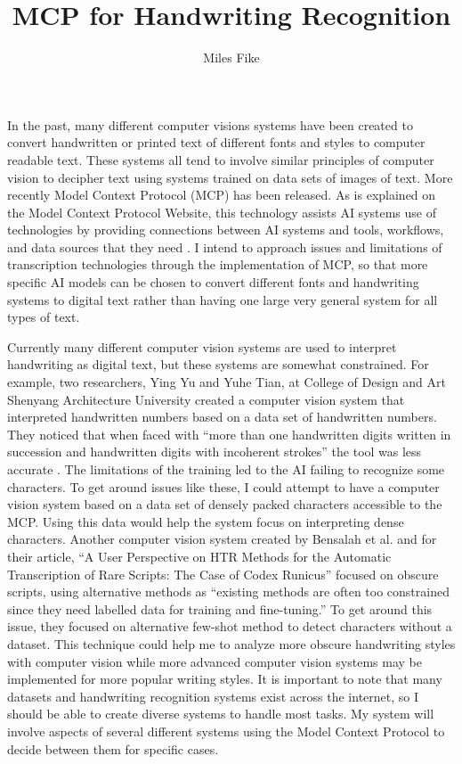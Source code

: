 \documentclass[12pt]{article}
\title{\textbf{MCP for Handwriting Recognition}}
\author{Miles Fike}
\begin{document}
\maketitle

In the past, many different computer visions systems have been created to convert handwritten or printed text of different fonts and styles to computer readable text. These systems all tend to involve similar principles of computer vision to decipher text using systems trained on data sets of images of text. More recently Model Context Protocol (MCP) has been released. As is explained on the Model Context Protocol Website, this technology assists AI systems use of technologies by providing connections between AI systems and tools, workflows, and data sources that they need \cite{modelContextProtocol/getting-started/intro}. I intend to approach issues and limitations of transcription technologies through the implementation of MCP, so that more specific AI models can be chosen to convert different fonts and handwriting systems to digital text rather than having one large very general system for all types of text. 

Currently many different computer vision systems are used to interpret handwriting as digital text, but these systems are somewhat constrained.  For example, two researchers, Ying Yu and Yuhe Tian, at College of Design and Art Shenyang Architecture University created a computer vision system that interpreted handwritten numbers based on a data set of handwritten numbers. They noticed that when faced with “more than one handwritten digits written in succession and handwritten digits with incoherent strokes” the tool was less accurate \cite{10.1145/3727648.3727679}. The limitations of the training led to the AI failing to recognize some characters. To get around issues like these, I could attempt to have a computer vision system based on a data set of densely packed characters accessible to the MCP. Using this data would help the system focus on interpreting dense characters. Another computer vision system created by Bensalah et al. and for their article, “A User Perspective on HTR Methods for the Automatic Transcription of Rare Scripts: The Case of Codex Runicus” focused on obscure scripts, using alternative methods as “existing methods are often too constrained since they need labelled data for training and fine-tuning.” \cite{10.1145/3519306}  To get around this issue, they focused on alternative few-shot method to detect characters without a dataset. This technique could help me to analyze more obscure handwriting styles with computer vision while more advanced computer vision systems may be implemented for more popular writing styles. It is important to note that many datasets and handwriting recognition systems exist across the internet, so I should be able to create diverse systems to handle most tasks. My system will involve aspects of several different systems using the Model Context Protocol to decide between them for specific cases.
\end{document}
